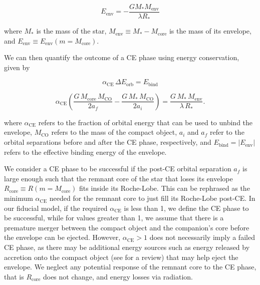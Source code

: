 \documentclass[linenumbers,trackchanges,twocolumn]{aastex701}
\begin{document}
\begin{equation}
    E_{\text{env}} = -\frac{GM_*M_{\text{env}}}{\lambda R_{*}}
\end{equation}

where $M_*$ is the mass of the star, $M_{\text{env}} \equiv M_* - M_{\text{core}}$ is the mass of its envelope, and $E_{\text{env}} \equiv E_{\text{env}}(m = M_{\text{core}})$.

We can then quantify the outcome of a CE phase using energy conservation, given by

\begin{equation}
    \alpha_{\mathrm{CE}}\,\Delta E_{\mathrm{orb}} = E_{\mathrm{bind}}
    \label{eq:ce_energy_balance}
\end{equation}

\begin{equation}
    \alpha_{\text{CE}}\left(\frac{G\,M_{\mathrm{core}}\,M_{\mathrm{CO}}}{2a_f}
    - \frac{G\,M_*\,M_{\mathrm{CO}}}{2a_i}\right) = \frac{G\,M_*\,M_{\mathrm{env}}}{\lambda\,R_*}.
    \label{eq:ce_energy_terms}
\end{equation}

where $\alpha_{\text{CE}}$ refers to the fraction of orbital energy that can be used to unbind the envelope, $M_{\mathrm{CO}}$ refers to the mass of the compact object, $a_i$ and $a_f$ refer to the orbital separations before and after the CE phase, respectively, and $E_{\mathrm{bind}} = |E_{\mathrm{env}}|$ refers to the effective binding energy of the envelope.

We consider a CE phase to be successful if the post-CE orbital separation $a_f$ is large enough such that the remnant core of the star that loses its envelope $R_{\text{core}} \equiv R(m = M_{\text{core}})$ fits inside its Roche-Lobe. This can be rephrased as the minimum $\alpha_{\text{CE}}$ needed for the remnant core to just fill its Roche-Lobe post-CE. In our fiducial model, if the required $\alpha_{\text{CE}}$ is less than 1, we define the CE phase to be successful, while for values greater than 1, we assume that there is a premature merger between the compact object and the companion's core before the envelope can be ejected. However, $\alpha_{\text{CE}} > 1$ does not necessarily imply a failed CE phase, as there may be additional energy sources such as energy released by accretion onto the compact object (see \citealp{2020cee..book.....I} for a review) that may help eject the envelope. We neglect any potential response of the remnant core to the CE phase, that is $R_{\text{core}}$ does not change, and energy losses via radiation.
\end{document}
